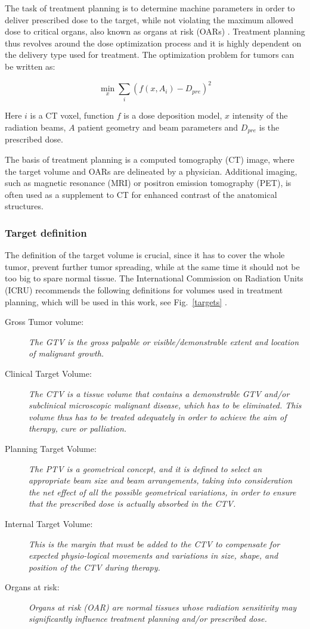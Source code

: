 The task of treatment planning is to determine machine parameters in order to deliver prescribed dose to the target, while not violating the maximum allowed dose to critical organs, also known as organs at risk (OARs) \cite{Richter2012}.
Treatment planning thus revolves around the dose optimization process and it is highly dependent on the delivery type used for treatment. The optimization problem for tumors can be written as:

\begin{equation}
  \min_{x} \sum_{i} \left( f(x,A_i) - D_{pre} \right)^2 
\end{equation}

Here $i$ is a CT voxel, function $f$ is a dose deposition model, $x$ intensity of the radiation beams, $A$ patient geometry and beam parameters and $D_{pre}$ is the prescribed dose.

The basis of treatment planning is a computed tomography (CT) image, where the target volume and OARs are delineated by a physician. 
Additional imaging, such as magnetic resonance (MRI) or positron emission tomography (PET), is often used as a supplement to CT for enhanced contrast of the anatomical structures. 


\subsubsection{Target definition}
The definition of the target volume is crucial, since it has to cover the whole tumor, prevent further tumor spreading, while at the same time it should not be too big to spare normal tissue. 
The International Commission on Radiation Units (ICRU) recommends the following definitions for volumes used in treatment planning, which will be used in this work, see Fig.~\ref{targets} \cite{ICRU50, ICRU62}.
\begin{description}
\item[Gross Tumor volume:] \emph{The GTV is the gross
    palpable or visible/demonstrable extent and location of malignant
    growth.}
\item[Clinical Target Volume:] \emph{The CTV is a tissue
    volume that contains a demonstrable GTV and/or subclinical
    microscopic malignant disease, which has to be eliminated. This
    volume thus has to be treated adequately in order to achieve the
    aim of therapy, cure or palliation.}
\item[Planning Target Volume:] \emph{The PTV is a geometrical
    concept, and it is defined to select an appropriate beam size and
    beam arrangements, taking into consideration the net effect of all
    the possible geometrical variations, in order to ensure that the
    prescribed dose is actually absorbed in the CTV.}
\item[Internal Target Volume:] \emph{This is the margin that must be
    added to the CTV to compensate for expected physio-logical
    movements and variations in size, shape, and position of the
    CTV during therapy.}
\item[Organs at risk:] \emph{Organs at risk (OAR) are normal
    tissues whose radiation sensitivity may significantly influence
    treatment planning and/or prescribed dose.}
\end{description}

